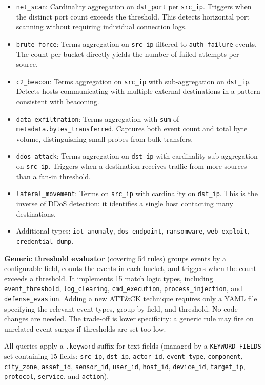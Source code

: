 \documentclass[conference,10pt]{IEEEtran}
\begin{document}
\begin{itemize}[leftmargin=*,nosep]
    \item \texttt{net\_scan}: Cardinality aggregation on \texttt{dst\_port} per \texttt{src\_ip}. Triggers when the distinct port count exceeds the threshold. This detects horizontal port scanning without requiring individual connection logs.
    \item \texttt{brute\_force}: Terms aggregation on \texttt{src\_ip} filtered to \texttt{auth\_failure} events. The count per bucket directly yields the number of failed attempts per source.
    \item \texttt{c2\_beacon}: Terms aggregation on \texttt{src\_ip} with sub-aggregation on \texttt{dst\_ip}. Detects hosts communicating with multiple external destinations in a pattern consistent with beaconing.
    \item \texttt{data\_exfiltration}: Terms aggregation with \texttt{sum} of \texttt{metadata.bytes\_transferred}. Captures both event count and total byte volume, distinguishing small probes from bulk transfers.
    \item \texttt{ddos\_attack}: Terms aggregation on \texttt{dst\_ip} with cardinality sub-aggregation on \texttt{src\_ip}. Triggers when a destination receives traffic from more sources than a fan-in threshold.
    \item \texttt{lateral\_movement}: Terms on \texttt{src\_ip} with cardinality on \texttt{dst\_ip}. This is the inverse of DDoS detection: it identifies a single host contacting many destinations.
    \item Additional types: \texttt{iot\_anomaly}, \texttt{dos\_endpoint}, \texttt{ransomware}, \texttt{web\_exploit}, \texttt{credential\_dump}.
\end{itemize}

\textbf{Generic threshold evaluator} (covering 54 rules) groups events by a configurable field, counts the events in each bucket, and triggers when the count exceeds a threshold. It implements 15 match logic types, including \texttt{event\_threshold}, \texttt{log\_clearing}, \texttt{cmd\_execution}, \texttt{process\_injection}, and \texttt{defense\_evasion}. Adding a new ATT\&CK technique requires only a YAML file specifying the relevant event types, group-by field, and threshold. No code changes are needed. The trade-off is lower specificity: a generic rule may fire on unrelated event surges if thresholds are set too low.

All queries apply a \texttt{.keyword} suffix for text fields (managed by a \texttt{KEYWORD\_FIELDS} set containing 15 fields: \texttt{src\_ip}, \texttt{dst\_ip}, \texttt{actor\_id}, \texttt{event\_type}, \texttt{component}, \texttt{city\_zone}, \texttt{asset\_id}, \texttt{sensor\_id}, \texttt{user\_id}, \texttt{host\_id}, \texttt{device\_id}, \texttt{target\_ip}, \texttt{protocol}, \texttt{service}, and \texttt{action}).
\end{document}
